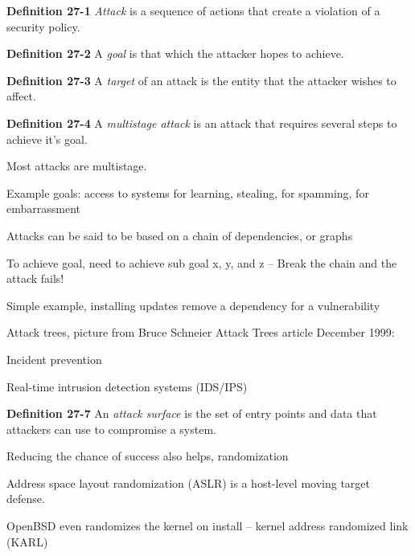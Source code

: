 \documentclass[Screen16to9,17pt]{foils}
\begin{document}
\begin{list1}
\item {\bf Definition 27-1} \emph{Attack} is a sequence of actions that create a violation of a security policy.
\item {\bf Definition 27-2} A \emph{goal} is that which the attacker hopes to achieve.
\item {\bf Definition 27-3} A \emph{target} of an attack is the entity that the attacker wishes to affect.
\item {\bf Definition 27-4} A \emph{multistage attack} is an attack that requires several steps to achieve it's goal.
\item Most attacks are multistage.
\item Example goals: access to systems for learning, stealing,  for spamming, for embarrassment
\end{list1}




\begin{list2}
\item Attacks can be said to be based on a chain of dependencies, or graphs
\item To achieve goal, need to achieve sub goal x, y, and z -- Break the chain and the attack fails!
\item Simple example, installing updates remove a dependency for a vulnerability
\item Attack trees, picture from Bruce Schneier Attack Trees article December 1999:\\ {\footnotesize{}}
\end{list2}




\begin{list2}
\item Incident prevention
\item Real-time intrusion detection systems (IDS/IPS)
\item {\bf Definition 27-7} An \emph{attack surface} is the set of entry points and data that attackers can use to compromise a system.
\item Reducing the chance of success also helps, randomization
\item Address space layout randomization (ASLR) is a host-level moving target defense.
\item OpenBSD even randomizes the kernel on install -- kernel address randomized link (KARL)
\end{list2}
\end{document}
